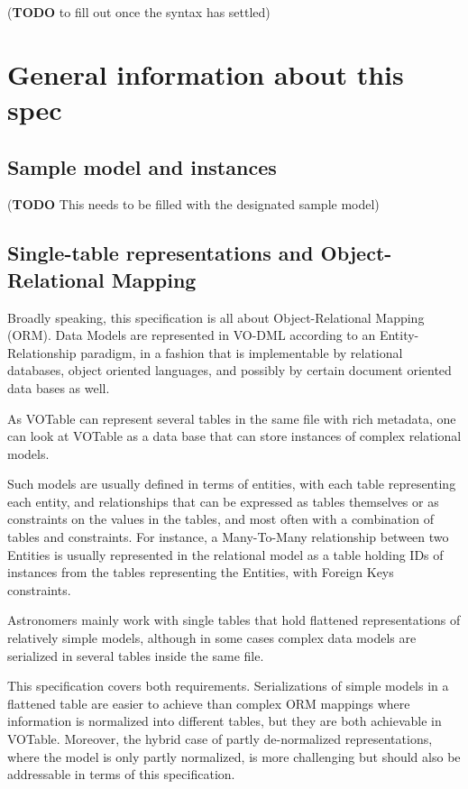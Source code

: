 \documentclass[11pt,a4paper]{ivoa}
\begin{document}
(\textbf{TODO} to fill out once the syntax has settled)

\section{General information about this spec}\label{sec:info}

\subsection{Sample model and
instances}\label{sample-model-and-instances}

(\textbf{TODO} This needs to be filled with the designated sample model)

\subsection{Single-table representations and Object-Relational
Mapping}\label{single-table-representations-and-object-relational-mapping}

Broadly speaking, this specification is all about Object-Relational
Mapping (ORM). Data Models are represented in VO-DML according to an
Entity-Relationship paradigm, in a fashion that is implementable by
relational databases, object oriented languages, and possibly by certain
document oriented data bases as well.

As VOTable can represent several tables in the same file with rich
metadata, one can look at VOTable as a data base that can store
instances of complex relational models.

Such models are usually defined in terms of entities, with each table
representing each entity, and relationships that can be expressed as
tables themselves or as constraints on the values in the tables, and
most often with a combination of tables and constraints. For instance, a
Many-To-Many relationship between two Entities is usually represented in
the relational model as a table holding IDs of instances from the tables
representing the Entities, with Foreign Keys constraints.

Astronomers mainly work with single tables that hold flattened
representations of relatively simple models, although in some cases
complex data models are serialized in several tables inside the same
file.

This specification covers both requirements. Serializations of simple
models in a flattened table are easier to achieve than complex ORM
mappings where information is normalized into different tables, but they
are both achievable in VOTable. Moreover, the hybrid case of partly
de-normalized representations, where the model is only partly
normalized, is more challenging but should also be addressable in terms
of this specification.
\end{document}
